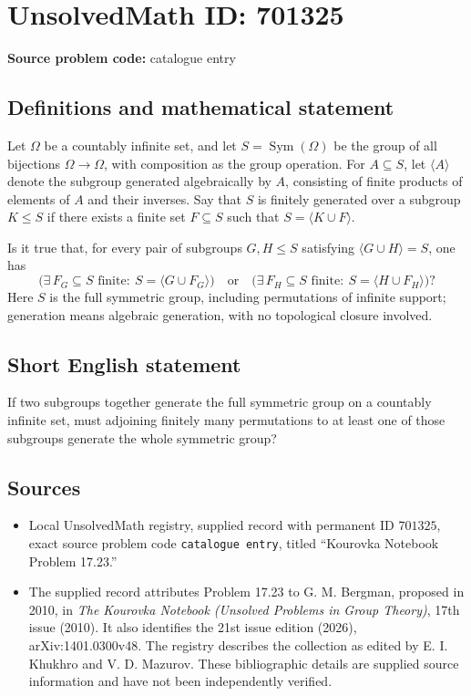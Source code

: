 \documentclass[11pt]{article}
\begin{document}
\section*{UnsolvedMath ID: 701325}
\textbf{Source problem code:} catalogue entry
\subsection{Definitions and mathematical statement}
Let \(\Omega\) be a countably infinite set, and let \(S=\operatorname{Sym}(\Omega)\) be the group of all bijections \(\Omega\to\Omega\), with composition as the group operation. For \(A\subseteq S\), let \(\langle A\rangle\) denote the subgroup generated algebraically by \(A\), consisting of finite products of elements of \(A\) and their inverses. Say that \(S\) is finitely generated over a subgroup \(K\leq S\) if there exists a finite set \(F\subseteq S\) such that \(S=\langle K\cup F\rangle\).

Is it true that, for every pair of subgroups \(G,H\leq S\) satisfying \(\langle G\cup H\rangle=S\), one has
\[
\bigl(\exists\,F_G\subseteq S\text{ finite}:\ S=\langle G\cup F_G\rangle\bigr)
\quad\text{or}\quad
\bigl(\exists\,F_H\subseteq S\text{ finite}:\ S=\langle H\cup F_H\rangle\bigr)?
\]
Here \(S\) is the full symmetric group, including permutations of infinite support; generation means algebraic generation, with no topological closure involved.
\subsection{Short English statement}
If two subgroups together generate the full symmetric group on a countably infinite set, must adjoining finitely many permutations to at least one of those subgroups generate the whole symmetric group?
\subsection{Sources}
\begin{itemize}
\item Local UnsolvedMath registry, supplied record with permanent ID \(701325\), exact source problem code \texttt{catalogue entry}, titled ``Kourovka Notebook Problem 17.23.''
\item The supplied record attributes Problem 17.23 to G. M. Bergman, proposed in 2010, in \emph{The Kourovka Notebook (Unsolved Problems in Group Theory)}, 17th issue (2010). It also identifies the 21st issue edition (2026), arXiv:1401.0300v48. The registry describes the collection as edited by E. I. Khukhro and V. D. Mazurov. These bibliographic details are supplied source information and have not been independently verified.
\end{itemize}
\end{document}
